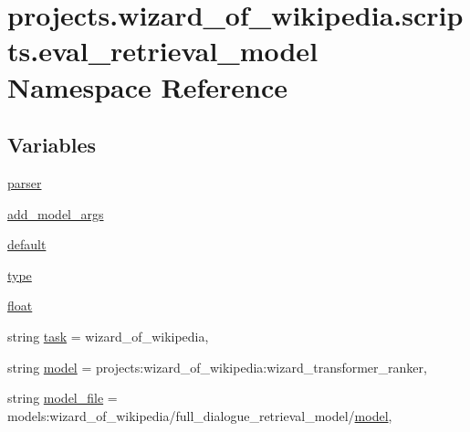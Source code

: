 \hypertarget{namespaceprojects_1_1wizard__of__wikipedia_1_1scripts_1_1eval__retrieval__model}{}\section{projects.\+wizard\+\_\+of\+\_\+wikipedia.\+scripts.\+eval\+\_\+retrieval\+\_\+model Namespace Reference}
\label{namespaceprojects_1_1wizard__of__wikipedia_1_1scripts_1_1eval__retrieval__model}
\subsection*{Variables}
\begin{DoxyCompactItemize}
\item 
\hyperlink{namespaceprojects_1_1wizard__of__wikipedia_1_1scripts_1_1eval__retrieval__model_a34e16cfd6f3b5f0f7862d12015cff906}{parser}
\item 
\hyperlink{namespaceprojects_1_1wizard__of__wikipedia_1_1scripts_1_1eval__retrieval__model_a4292ce71363be2e979d730f31cbef28f}{add\+\_\+model\+\_\+args}
\item 
\hyperlink{namespaceprojects_1_1wizard__of__wikipedia_1_1scripts_1_1eval__retrieval__model_a990de8456f40c15f5adae005e1791e0e}{default}
\item 
\hyperlink{namespaceprojects_1_1wizard__of__wikipedia_1_1scripts_1_1eval__retrieval__model_ab86c7688750e6401627c950e1cc4dec4}{type}
\item 
\hyperlink{namespaceprojects_1_1wizard__of__wikipedia_1_1scripts_1_1eval__retrieval__model_a5d9265fb70b57e0dc7fb2d7a4f9318a2}{float}
\item 
string \hyperlink{namespaceprojects_1_1wizard__of__wikipedia_1_1scripts_1_1eval__retrieval__model_a2a4961469648497ddb48825f771883b9}{task} = \textquotesingle{}wizard\+\_\+of\+\_\+wikipedia\textquotesingle{},
\item 
string \hyperlink{namespaceprojects_1_1wizard__of__wikipedia_1_1scripts_1_1eval__retrieval__model_af4db8cf9397976689e2a255ea25e794e}{model} = \textquotesingle{}projects\+:wizard\+\_\+of\+\_\+wikipedia\+:wizard\+\_\+transformer\+\_\+ranker\textquotesingle{},
\item 
string \hyperlink{namespaceprojects_1_1wizard__of__wikipedia_1_1scripts_1_1eval__retrieval__model_aaf80d07759dec91ae481cd743fe628f5}{model\+\_\+file} = \textquotesingle{}models\+:wizard\+\_\+of\+\_\+wikipedia/full\+\_\+dialogue\+\_\+retrieval\+\_\+model/\hyperlink{namespaceprojects_1_1wizard__of__wikipedia_1_1scripts_1_1eval__retrieval__model_af4db8cf9397976689e2a255ea25e794e}{model}\textquotesingle{},

\end{DoxyCompactItemize}
